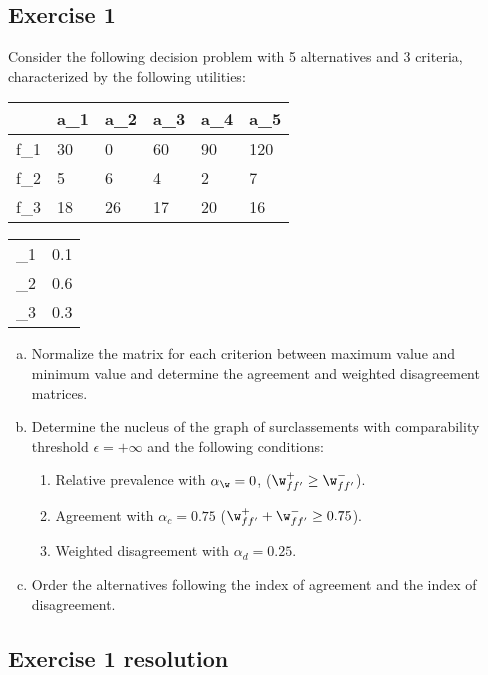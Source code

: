 \documentclass[\main/main.tex]{subfiles}
\begin{document}
\subsection{Exercise 1}
Consider the following decision problem with 5 alternatives and 3 criteria, characterized by the following utilities:

\begin{table}
	\begin{tabular}{L|LLLLL}
		 & a_1 & a_2 & a_3 & a_4 & a_5 \\
		\hline
		f_1               & 30  & 0   & 60  & 90  & 120 \\
		f_2               & 5   & 6   & 4   & 2   & 7   \\
		f_3               & 18  & 26  & 17  & 20  & 16
	\end{tabular}
	\begin{tabular}{L|L}
		     &  \\
		\hline
		\w_1 & 0.1            \\
		\w_2 & 0.6            \\
		\w_3 & 0.3
	\end{tabular}
\end{table}

\begin{enumerate}[a)]
	\item Normalize the matrix for each criterion between maximum value and minimum value and determine the agreement and weighted disagreement matrices.
	\item Determine the nucleus of the graph of surclassements with comparability threshold $\epsilon=+\infty$ and the following conditions:
	      \begin{enumerate}[1)]
		      \item Relative prevalence with $\alpha_{\w}=0$, ($\w^+_{ff'}\geq \w^-_{ff'}$).
		      \item Agreement with $\alpha_c=0.75$ ($\w^+_{ff'}+\w^-_{ff'}\geq 0.75$).
		      \item Weighted disagreement with $\alpha_d=0.25$.
	      \end{enumerate}
	\item Order the alternatives following the index of agreement and the index of disagreement.
\end{enumerate}

\subsection{Exercise 1 resolution}
\end{document}
